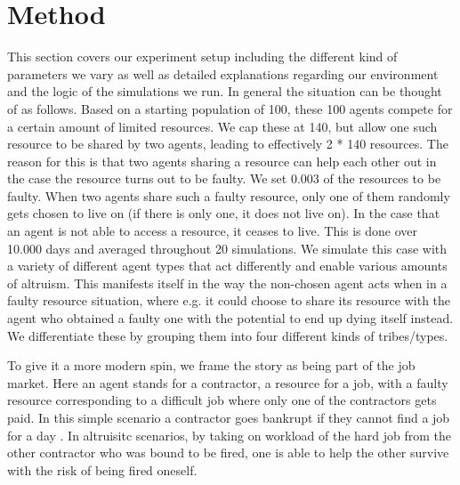 \documentclass[sigconf]{acmart}
\newcommand{\todo}[1]{{\color{red}{#1}}}
\newcommand{\VNumSimulations}{20\xspace}
\newcommand{\VNumDays}{10.000\xspace}
\newcommand{\VNumPop}{100\xspace}
\newcommand{\VNumTrees}{140\xspace}
\newcommand{\VProbPredator}{0.003\xspace}
\begin{document}
    \section{Method}\label{sec:method}
    This section covers our experiment setup including the different kind of parameters we vary as well as detailed explanations regarding our environment and the logic of the simulations we run.
    In general the situation can be thought of as follows.
    Based on a starting population of \VNumPop, these \VNumPop agents compete for a certain amount of limited resources.
    We cap these at \VNumTrees, but allow one such resource to be shared by two agents, leading to effectively 2 * \VNumTrees resources.
    The reason for this is that two agents sharing a resource can help each other out in the case the resource turns out to be faulty.
    We set \VProbPredator of the resources to be faulty.
    When two agents share such a faulty resource, only one of them randomly gets chosen to live on (if there is only one, it does not live on).
    In the case that an agent is not able to access a resource, it ceases to live.
    This is done over \VNumDays days and averaged throughout \VNumSimulations simulations.
    We simulate this case with a variety of different agent types that act differently and enable various amounts of altruism.
    This manifests itself in the way the non-chosen agent acts when in a faulty resource situation, where e.g. it could choose to share its resource with the agent who obtained a faulty one with the potential to end up dying itself instead.
    We differentiate these by grouping them into four different kinds of tribes/types.

    To give it a more modern spin, we frame the story as being part of the job market.
    Here an agent stands for a contractor, a resource for a job, with a faulty resource corresponding to a difficult job where only one of the contractors gets paid.
    In this simple scenario a contractor goes bankrupt if they cannot find a job for a day \todo{and when simulating the stable population, agents are not able to finish the job on time and both get fired}.
    In altruisitc scenarios, by taking on workload of the hard job from the other contractor who was bound to be fired, one is able to help the other survive with the risk of being fired oneself.

    \todo{Add code step by step, or config for each experiment in the appendix, whole code in general in the appendix}
\end{document}
